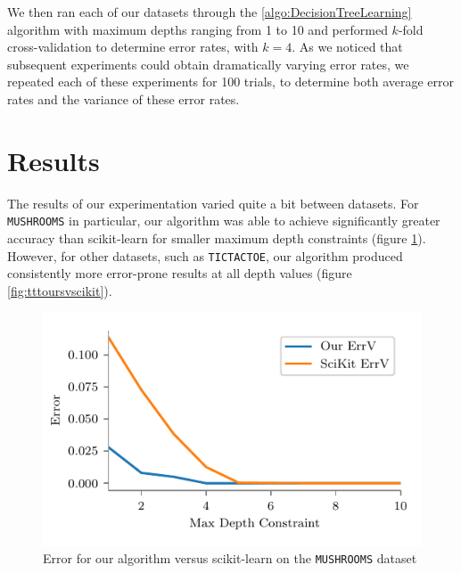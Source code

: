 \documentclass[screen, authorversion, nonacm, sigconf]{acmart}
\begin{document}
We then ran each of our datasets through the \ref{algo:DecisionTreeLearning} algorithm with maximum depths ranging from 1 to 10 and performed $k$-fold cross-validation to determine error rates, with $k = 4$. As we noticed that subsequent experiments could obtain dramatically varying error rates, we repeated each of these experiments for 100 trials, to determine both average error rates and the variance of these error rates.

\section{Results}

The results of our experimentation varied quite a bit between datasets. For \texttt{MUSHROOMS} in particular, our algorithm was able to achieve significantly greater accuracy than scikit-learn for smaller maximum depth constraints (figure \ref{fig:mushoursvscikit}). However, for other datasets, such as \texttt{TICTACTOE}, our algorithm produced consistently more error-prone results at all depth values (figure \ref{fig:tttoursvscikit}).

\begin{figure}
  \centering
  \includegraphics[width=\columnwidth]{figures/chart_ours_v_scikit_mushrooms.pdf}
  \caption{Error for our algorithm versus scikit-learn on the \texttt{MUSHROOMS} dataset}
  \label{fig:mushoursvscikit}
\end{figure}
\end{document}
